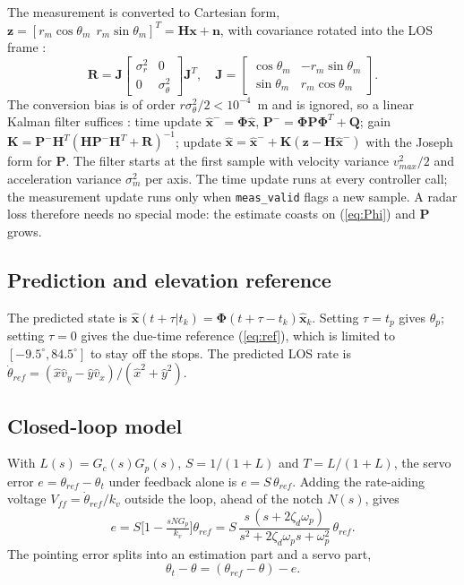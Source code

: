 \documentclass[conference]{IEEEtran}
\newcommand{\sm}{\sigma_m}
\begin{document}
The measurement is converted to Cartesian form, $\mathbf z=[r_m\cos\theta_m\ \ r_m\sin\theta_m]^T=\mathbf H\mathbf x+\mathbf n$, with covariance rotated into the LOS frame \cite{lerro}:
\begin{equation}
\mathbf R=\mathbf J\begin{bmatrix}\sigma_r^2&0\\0&\sigma_\theta^2\end{bmatrix}\mathbf J^T,\quad
\mathbf J=\begin{bmatrix}\cos\theta_m&-r_m\sin\theta_m\\ \sin\theta_m&r_m\cos\theta_m\end{bmatrix}.
\end{equation}
The conversion bias is of order $r\sigma_\theta^2/2<10^{-4}$~m and is ignored, so a linear Kalman filter suffices \cite{barshalom}: time update $\hat{\mathbf x}^-=\bm\Phi\hat{\mathbf x}$, $\mathbf P^-=\bm\Phi\mathbf P\bm\Phi^T+\mathbf Q$; gain $\mathbf K=\mathbf P^-\mathbf H^T(\mathbf H\mathbf P^-\mathbf H^T+\mathbf R)^{-1}$; update $\hat{\mathbf x}=\hat{\mathbf x}^-+\mathbf K(\mathbf z-\mathbf H\hat{\mathbf x}^-)$ with the Joseph form for $\mathbf P$. The filter starts at the first sample with velocity variance $v_{max}^2/2$ and acceleration variance $\sm^2$ per axis. The time update runs at every controller call; the measurement update runs only when \texttt{meas\_valid} flags a new sample. A radar loss therefore needs no special mode: the estimate coasts on (\ref{eq:Phi}) and $\mathbf P$ grows.

\subsection{Prediction and elevation reference}
The predicted state is $\hat{\mathbf x}(t+\tau|t_k)=\bm\Phi(t+\tau-t_k)\hat{\mathbf x}_k$. Setting $\tau=t_p$ gives $\theta_p$; setting $\tau=0$ gives the due-time reference (\ref{eq:ref}), which is limited to $[-9.5^\circ,84.5^\circ]$ to stay off the stops. The predicted LOS rate is $\dot\theta_{ref}=(\hat x\hat v_y-\hat y\hat v_x)/(\hat x^2+\hat y^2)$.

\subsection{Closed-loop model}
With $L(s)=G_c(s)G_p(s)$, $S=1/(1+L)$ and $T=L/(1+L)$, the servo error $e=\theta_{ref}-\theta_t$ under feedback alone is $e=S\,\theta_{ref}$. Adding the rate-aiding voltage $V_{ff}=\dot\theta_{ref}/k_v$ outside the loop, ahead of the notch $N(s)$, gives
\begin{equation}
e=S\Big[1-\tfrac{sNG_p}{k_v}\Big]\theta_{ref}=S\,\frac{s\,(s+2\zeta_d\omega_p)}{s^2+2\zeta_d\omega_ps+\omega_p^2}\,\theta_{ref}.
\label{eq:err}
\end{equation}
The pointing error splits into an estimation part and a servo part,
\begin{equation}
\theta_t-\theta=(\theta_{ref}-\theta)-e .
\label{eq:split}
\end{equation}
\end{document}
